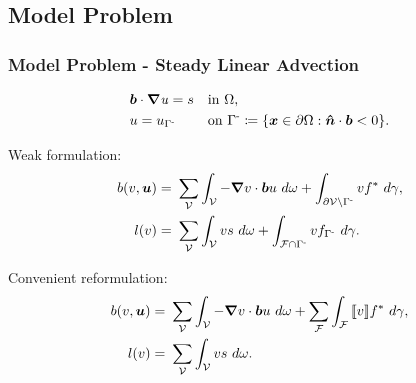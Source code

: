 \subsection{Model Problem}

\begin{frame}
\frametitle{Model Problem - Steady Linear Advection}

\begin{subequations}
\begin{align}
& \varv{b} \cdot \nabla \vars{u} = s && \text{in}\ \Omega, \label{eq:linear_advection_omega} \\
& u = u_{\Gamma^{\text{-}}}\ && \text{on}\ \Gamma^{\text{-}} \coloneqq \{ \varv{x} \in \partial\Omega : \varv{\hat{n}} \cdot \vect{b} < 0 \}.
\end{align}
\end{subequations}

Weak formulation:
\begin{subequations} \label{eq:variational_form_advection}
\begin{align}
b(v,\varg{u})
=\ & \sum_{\fe{V}}
\int_{\fe{V}} - \nabla v \cdot \varv{b} u\ d\omega +
\int_{\partial\fe{V} \setminus \Gamma^{\text{-}}} v f^*\ d\gamma, \label{eq:bilinear_pg_advection} \\
l(v)
=\ & \sum_{\fe{V}} \int_{\fe{V}} v s\ d\omega + \int_{\fe{F} \cap \Gamma^{\text{-}}} v f_{\Gamma^{\text{-}}}\ d\gamma.
\label{eq:bilinear_pg_advection_l}
\end{align}
\end{subequations}

Convenient reformulation:
\begin{align} \label{eq:bilinear_pg_advection_jump}
b(v,\varg{u})
=\ & \sum_{\fe{V}} \int_{\fe{V}} - \nabla v \cdot \varv{b} u\ d\omega
+ \sum_{\fe{F}} \int_{\fe{F}} \jump{v} f^*\ d\gamma, \\
l(v)
=\ & \sum_{\fe{V}} \int_{\fe{V}} v s\ d\omega.
\end{align}

\end{frame}
